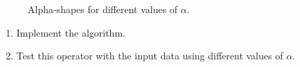 \begin{figure}[htbp]
\hspace{.5cm}
\hspace{.5cm}
\caption{Alpha-shapes for different values of $\alpha$.}
\label{fig:alphashapes:alphashapes}
\end{figure}

\begin{qbox}
\begin{enumerate}
\item Implement the algorithm.
\item Test this operator with the input data using different values of $\alpha$.
\end{enumerate}
\end{qbox}


